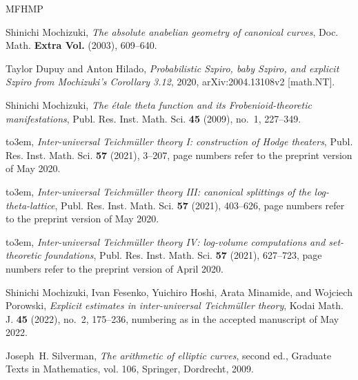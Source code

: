 \documentclass[11pt]{amsart}
\theoremstyle{remark}
\begin{document}
\providecommand{\bysame}{\leavevmode\hbox to3em{\hrulefill}\thinspace}
\providecommand{\MR}{\relax\ifhmode\unskip\space\fi MR }
\providecommand{\MRhref}[2]{%
  \href{http://www.ams.org/mathscinet-getitem?mr=#1}{#2}
}
\providecommand{\href}[2]{#2}
\begin{thebibliography}{MFHMP}

Shinichi Mochizuki, \emph{The absolute anabelian geometry of canonical curves},
  Doc. Math. \textbf{Extra Vol.} (2003), 609--640.

Taylor Dupuy and Anton Hilado, \emph{Probabilistic {S}zpiro, baby {S}zpiro, and
  explicit {S}zpiro from {M}ochizuki's {C}orollary 3.12}, 2020,
  arXiv:2004.13108v2 [math.NT].

Shinichi Mochizuki, \emph{The \'etale theta function and its
  {F}robenioid-theoretic manifestations}, Publ. Res. Inst. Math. Sci.
  \textbf{45} (2009), no.~1, 227--349.

\bysame, \emph{Inter-universal {T}eichm\"uller theory {I}: construction of
  {H}odge theaters}, Publ. Res. Inst. Math. Sci. \textbf{57} (2021), 3--207,
  page numbers refer to the preprint version of May 2020.

\bysame, \emph{Inter-universal {T}eichm\"uller theory {III}: canonical
  splittings of the log-theta-lattice}, Publ. Res. Inst. Math. Sci. \textbf{57}
  (2021), 403--626, page numbers refer to the preprint version of May 2020.

\bysame, \emph{Inter-universal {T}eichm\"uller theory {IV}: log-volume
  computations and set-theoretic foundations}, Publ. Res. Inst. Math. Sci.
  \textbf{57} (2021), 627--723, page numbers refer to the preprint version of
  April 2020.

Shinichi Mochizuki, Ivan Fesenko, Yuichiro Hoshi, Arata Minamide, and Wojciech
  Porowski, \emph{Explicit estimates in inter-universal {T}eichm\"uller
  theory}, Kodai Math. J. \textbf{45} (2022), no.~2, 175--236, numbering as in
  the accepted manuscript of May 2022.

Joseph~H. Silverman, \emph{The arithmetic of elliptic curves}, second ed.,
  Graduate Texts in Mathematics, vol. 106, Springer, Dordrecht, 2009.

\end{thebibliography}
\end{document}
